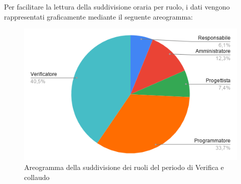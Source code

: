 \documentclass[../piano-di-progetto.tex]{subfiles}
\begin{document}
  Per facilitare la lettura della suddivisione oraria per ruolo, i dati vengono rappresentati graficamente mediante il seguente areogramma:
  \begin{figure}[H]
    \centering
    \includegraphics[width=12cm]{img/ruoli-verifica.png}
    \caption{Areogramma della suddivisione dei ruoli del periodo di Verifica e collaudo}
    \label{fig:ore-ruolo-verifica}
  \end{figure}
\end{document}
